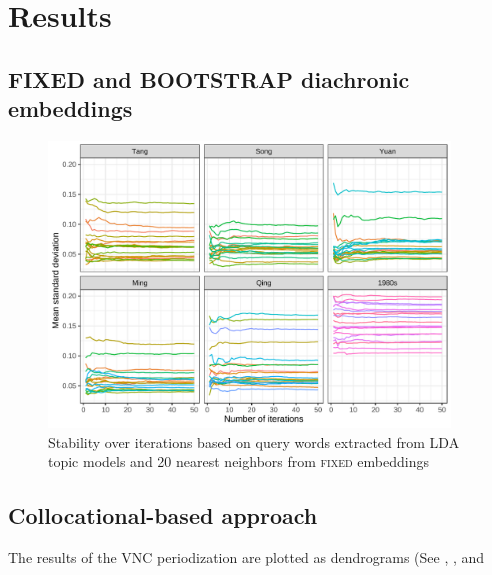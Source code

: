 

\chapter{Results}

\section{\textsc{FIXED} and \textsc{BOOTSTRAP} diachronic embeddings}

\begin{figure}[H]
  \centering
  \includegraphics[width=0.95\textwidth,keepaspectratio]{figures/stability_plot_mean_std}
  \caption{Stability over iterations based on query words extracted from LDA topic models and 20 nearest neighbors from \textsc{fixed} embeddings}
  \end{figure}

\section{Collocational-based approach}
The results of the VNC periodization are plotted as dendrograms (See , , and %

